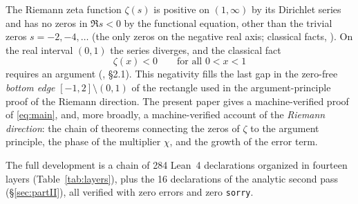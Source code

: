 \documentclass{article}
\newcommand{\zt}{\zeta}
\newcommand{\Xchi}{\chi}
\begin{document}
The Riemann zeta function $\zt(s)$ is positive on $(1,\infty)$ by its
Dirichlet series and has no zeros in $\Re s<0$ by the functional equation,
other than the trivial zeros $s=-2,-4,\dots$ (the only zeros on the
negative real axis; classical facts, \cite{titchmarsh}). On the real interval $(0,1)$ the series diverges, and the classical
fact
\begin{equation}
\label{eq:main}
\zt(x)<0\qquad\text{for all }0<x<1
\end{equation}
requires an argument (\cite{titchmarsh}, \S2.1). This negativity fills the last gap in the zero-free
\emph{bottom edge} $[-1,2]\setminus(0,1)$ of the rectangle used in the
argument-principle proof of the Riemann direction. The present paper gives a
machine-verified proof of \eqref{eq:main}, and, more broadly, a
machine-verified account of the \emph{Riemann direction}: the chain of
theorems connecting the zeros of $\zt$ to the argument principle, the phase
of the multiplier $\Xchi$, and the growth of the error term.

The full development is a chain of 284 Lean~4 declarations organized in
fourteen layers (Table~\ref{tab:layers}), plus the 16 declarations of the
analytic second pass (\S\ref{sec:partII}), all verified with zero errors
and zero \texttt{sorry}.
\end{document}
